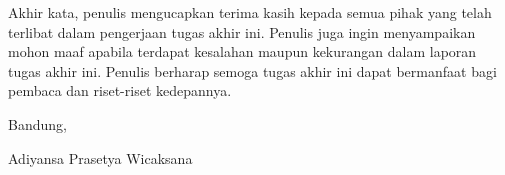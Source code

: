Akhir kata, penulis mengucapkan terima kasih kepada semua pihak yang telah terlibat dalam pengerjaan tugas akhir ini. Penulis juga ingin menyampaikan mohon maaf apabila terdapat kesalahan maupun kekurangan dalam laporan tugas akhir ini. Penulis berharap semoga tugas akhir ini dapat bermanfaat bagi pembaca dan riset-riset kedepannya.

\begin{flushright}
    \vspace{0.5cm}
    Bandung, \tanggalpengesahan


    \vspace{1.5cm}

    Adiyansa Prasetya Wicaksana
\end{flushright}
